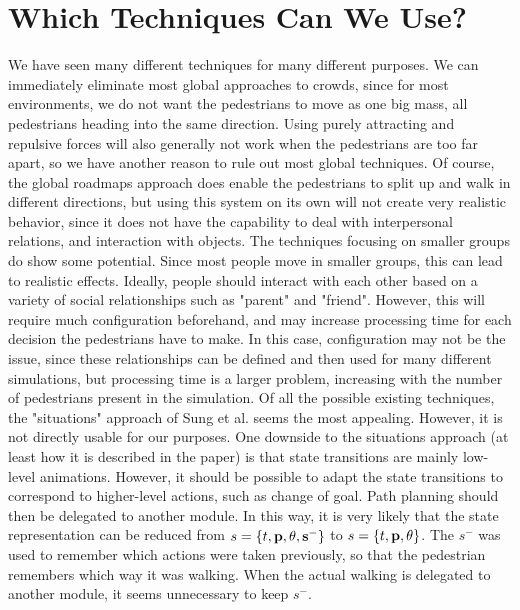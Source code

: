 \documentclass[11pt, a4paper]{book}
\begin{document}
\section{Which Techniques Can We Use?}
We have seen many different techniques for many different purposes. We can immediately eliminate most global approaches to  crowds, since for most environments, we do not want the pedestrians to move as one big mass, all pedestrians heading into the same direction. Using purely attracting and repulsive forces will also generally not work when the pedestrians are too far apart, so we have another reason to rule out most global techniques. Of course, the global roadmaps approach does enable the pedestrians to split up and walk in different directions, but using this system on its own will not create very realistic behavior, since it does not have the capability to deal with interpersonal relations, and interaction with objects.
The techniques focusing on smaller groups do show some potential. Since most people move in smaller groups, this can lead to realistic effects. Ideally, people should interact with each other based on a variety of social relationships such as "parent" and "friend". However, this will require much configuration beforehand, and may increase processing time for each decision the pedestrians have to make. In this case, configuration may not be the issue, since these relationships can be defined and then used for many different simulations, but processing time is a larger problem, increasing with the number of pedestrians present in the simulation.
Of all the possible existing techniques, the "situations" approach of Sung et al. seems the most appealing. However, it is not directly usable for our purposes. One downside to the situations approach (at least how it is described in the paper) is that state transitions are mainly low-level animations. However, it should be possible to adapt the state transitions to correspond to higher-level actions, such as change of goal. Path planning should then be delegated to another module. In this way, it is very likely that the state representation can be reduced from $s = \{t, \bf{p}, \theta, s^- \}$ to $s = \{t, \bf{p}, \theta\}$. The $s^-$ was used to remember which actions were taken previously, so that the pedestrian remembers which way it was walking. When the actual walking is delegated to another module, it seems unnecessary to keep $s^-$.
\end{document}

